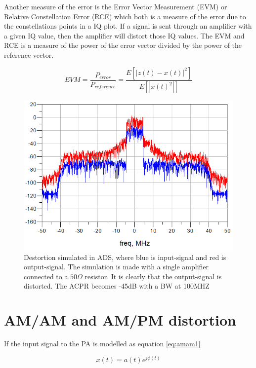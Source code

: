 Another measure of the error is the Error Vector Measurement (EVM) or  Relative Constellation Error (RCE) which both is a measure of the error due to the constellations points in a IQ plot. If a signal is sent through an amplifier with a given IQ value, then the amplifier will distort those IQ values. The EVM and RCE is a measure of the power of the error vector divided by the power of the reference vector. \citep{ali2016}

\begin{equation} \label{eq:evm}
	EVM = \frac{P_{error}}{P_{reference}} = \frac{E[|z(t)-x(t)|^2]}{E[|x(t)^2|]}
\end{equation}  
 
\begin{figure}[H]
\centering 
\includegraphics[scale = 0.5]{figures/ch1/ads_nonlin_dest.png}
\caption{Destortion simulated in ADS, where blue is input-signal and red is output-signal. The simulation is made with a single amplifier connected to a $50\Omega$ resistor. It is clearly that the output-signal is distorted. The ACPR becomes -45dB with a BW at 100MHZ}
\label{fig:pre_cons}
\end{figure}


\section{AM/AM and AM/PM distortion}
If the input signal to the PA is modelled as equation \ref{eq:amam1}

\begin{equation}\label{eq:amam1}
x(t) = a(t)e^{j\phi(t)}
\end{equation}

